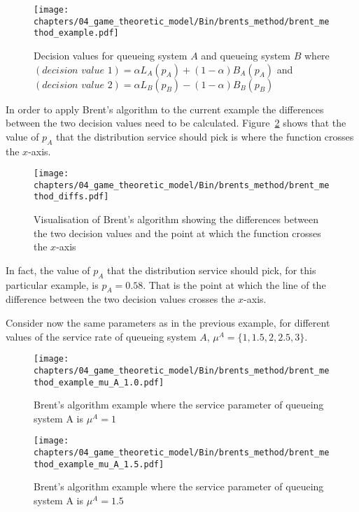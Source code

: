 \begin{figure}[H]
    \centering
    \texttt{[image: chapters/04\_game\_theoretic\_model/Bin/brents\_method/brent\_method\_example.pdf]}
    \caption{Decision values for queueing system \(A\) and queueing system \(B\)
    where \((\textit{decision value 1}) = \alpha L_A(p_A)+(1 - \alpha) B_A(p_A)\)
    and \((\textit{decision value 2}) = \alpha L_B(p_B) - (1 - \alpha) B_B(p_B)\)}
    \label{fig:brent_method_example}
\end{figure}

In order to apply Brent's algorithm to the current example the differences
between the two decision values need to be calculated.
Figure~\ref{fig:brent_method_diffs} shows that the value of \(p_A\) that the
distribution service should pick is where the function crosses the \(x\)-axis.

\begin{figure}[H]
    \centering
    \texttt{[image: chapters/04\_game\_theoretic\_model/Bin/brents\_method/brent\_method\_diffs.pdf]}
    \caption{Visualisation of Brent's algorithm showing the differences
    between the two decision values and the point at which the function crosses
    the \(x\)-axis}
    \label{fig:brent_method_diffs}
\end{figure}

In fact, the value of \(p_A\) that the distribution service should pick, for
this particular example, is \(p_A = 0.58\).
That is the point at which the line of the difference between the two decision
values crosses the \(x\)-axis.

Consider now the same parameters as in the previous example, for different
values of the service rate of queueing system \(A\), \(\mu^A =
\{1,1.5,2,2.5,3\}\).

\begin{figure}[H]
    \centering
    \texttt{[image: chapters/04\_game\_theoretic\_model/Bin/brents\_method/brent\_method\_example\_mu\_A\_1.0.pdf]}
    \caption{Brent's algorithm example where the service parameter of queueing
    system A is \(\mu^A = 1\)}
    \label{fig:brent_method_example_mu_A_1}
\end{figure}

\begin{figure}[H]
    \centering
    \texttt{[image: chapters/04\_game\_theoretic\_model/Bin/brents\_method/brent\_method\_example\_mu\_A\_1.5.pdf]}
    \caption{Brent's algorithm example where the service parameter of queueing
    system A is \(\mu^A = 1.5\)}
    \label{fig:brent_method_example_mu_A_2}
\end{figure}

